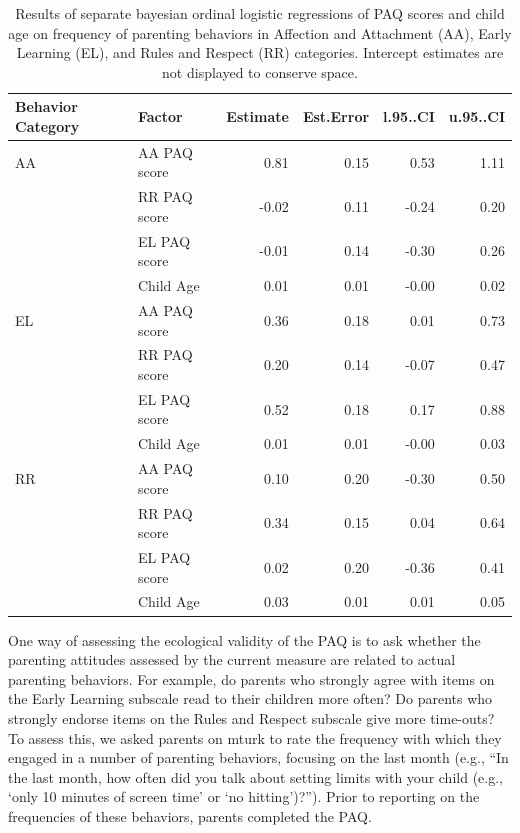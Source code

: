 \documentclass[man]{apa6}
\theoremstyle{definition}
\theoremstyle{definition}
\theoremstyle{definition}
\theoremstyle{remark}
\begin{document}
\begin{table}[h]
\centering
\begin{tabular}{llrrrr}
  \hline
Behavior Category & Factor & Estimate & Est.Error & l.95..CI & u.95..CI \\ 
  \hline
AA & AA PAQ score & 0.81 & 0.15 & 0.53 & 1.11 \\ 
   & RR PAQ score & -0.02 & 0.11 & -0.24 & 0.20 \\ 
   & EL PAQ score & -0.01 & 0.14 & -0.30 & 0.26 \\ 
   & Child Age & 0.01 & 0.01 & -0.00 & 0.02 \\ 
   \hline
EL & AA PAQ score & 0.36 & 0.18 & 0.01 & 0.73 \\ 
   & RR PAQ score & 0.20 & 0.14 & -0.07 & 0.47 \\ 
   & EL PAQ score & 0.52 & 0.18 & 0.17 & 0.88 \\ 
   & Child Age & 0.01 & 0.01 & -0.00 & 0.03 \\ 
   \hline
RR & AA PAQ score & 0.10 & 0.20 & -0.30 & 0.50 \\ 
   & RR PAQ score & 0.34 & 0.15 & 0.04 & 0.64 \\ 
   & EL PAQ score & 0.02 & 0.20 & -0.36 & 0.41 \\ 
   & Child Age & 0.03 & 0.01 & 0.01 & 0.05 \\ 
   \hline
\end{tabular}
\caption{Results of separate bayesian ordinal logistic regressions of PAQ scores and child age on frequency of parenting behaviors in Affection and Attachment (AA), Early Learning (EL), and Rules and Respect (RR) categories. Intercept estimates are not displayed to conserve space.} 
\end{table}

One way of assessing the ecological validity of the PAQ is to ask
whether the parenting attitudes assessed by the current measure are
related to actual parenting behaviors. For example, do parents who
strongly agree with items on the Early Learning subscale read to their
children more often? Do parents who strongly endorse items on the Rules
and Respect subscale give more time-outs? To assess this, we asked
parents on mturk to rate the frequency with which they engaged in a
number of parenting behaviors, focusing on the last month (e.g.,
\enquote{In the last month, how often did you talk about setting limits
with your child (e.g., \enquote{only 10 minutes of screen time} or
\enquote{no hitting})?}). Prior to reporting on the frequencies of these
behaviors, parents completed the PAQ.
\end{document}

